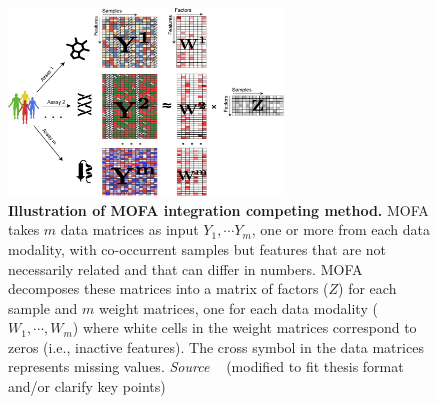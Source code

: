 \begin{description}
    \begin{figure}[!ht]
    	\centering
    	\includegraphics[width=0.65\textwidth]{Alg_MOFA/fig}
    	\vspace{0.1cm}
    	\caption[Illustration of MOFA integration competing method.]{\textbf{Illustration of MOFA integration competing method.} MOFA takes $m$ data matrices as input $Y_1, \cdots Y_m$, one or more from each data modality, with co-occurrent samples but features that are not necessarily related and that can differ in numbers. MOFA decomposes these matrices into a matrix of factors ($Z$) for each sample and $m$ weight matrices, one for each data modality ($W_1,\cdots, W_m$) where white cells in the weight matrices correspond to zeros (i.e., inactive features). The cross symbol in the data matrices represents missing values. \emph{Source ~\cite{tewari2017mofa}} (modified to fit thesis format and/or clarify key points) 
    }
    	\label{fig:Alg_MOFA}
    \end{figure}


\end{description}
